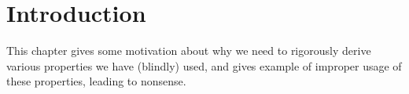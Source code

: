 \chapter{Introduction}\label{ch 1}
\begin{note}
This chapter gives some motivation about why we need to rigorously derive various properties we have (blindly) used, and gives example of improper usage of these properties, leading to nonsense.
\end{note}